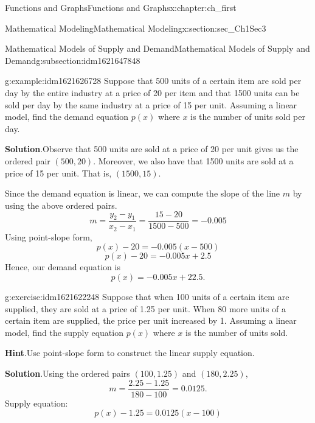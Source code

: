 \documentclass[oneside,10pt,]{book}
\newcommand{\blocktitlefont}{\relax}
\numberwithin{equation}{section}
\begin{document}
\begin{chapterptx}{Functions and Graphs}{}{Functions and Graphs}{}{}{x:chapter:ch_first}
\begin{sectionptx}{Mathematical Modeling}{}{Mathematical Modeling}{}{}{x:section:sec_Ch1Sec3}
\begin{subsectionptx}{Mathematical Models of Supply and Demand}{}{Mathematical Models of Supply and Demand}{}{}{g:subsection:idm1621647848}
\begin{example}{}{g:example:idm1621626728}
Suppose that 500 units of a certain item are sold per day by the entire industry at a price of \textdollar{}20 per item and that 1500 units can be sold per day by the same industry at a price of \textdollar{}15 per unit. Assuming a linear model, find the demand equation \(p(x)\) where \(x\) is the number of units sold per day.%
\par\smallskip%
\noindent\textbf{\blocktitlefont Solution}.\hypertarget{g:solution:idm1621628392}{}\quad{}Observe that 500 units are sold at a price of \textdollar{}20 per unit gives us the ordered pair \((500,20)\). Moreover, we also have that 1500 units are sold at a price of \textdollar{}15 per unit. That is, \((1500,15)\).%
\par
Since the demand equation is linear, we can compute the slope of the line \(m\) by using the above ordered pairs.%
%
\begin{equation*}
m=\frac{y_2-y_1}{x_2-x_1}=\frac{15-20}{1500-500}=-0.005
\end{equation*}
Using point-slope form,%
\begin{equation*}
p(x)-20=-0.005(x-500)
\end{equation*}
%
\begin{equation*}
p(x)-20=-0.005x+2.5
\end{equation*}
Hence, our demand equation is%
\begin{equation*}
p(x)=-0.005x+22.5\text{.}
\end{equation*}
\end{example}
\begin{inlineexercise}{}{g:exercise:idm1621622248}%
Suppose that when 100 units of a certain item are supplied, they are sold at a price of \textdollar{}1.25 per unit. When 80 more units of a certain item are supplied, the price per unit increased by \textdollar{}1. Assuming a linear model, find the supply equation \(p(x)\) where \(x\) is the number of units sold.\par\smallskip%
\noindent\textbf{\blocktitlefont Hint}.\hypertarget{g:hint:idm1621622504}{}\quad{}Use point-slope form to construct the linear supply equation.\par\smallskip%
\noindent\textbf{\blocktitlefont Solution}.\hypertarget{g:solution:idm1621618664}{}\quad{}Using the ordered pairs \((100,1.25)\) and \((180,2.25)\),%
%
\begin{equation*}
m=\frac{2.25-1.25}{180-100}=0.0125.
\end{equation*}
Supply equation:%
\begin{equation*}
p(x)-1.25=0.0125(x-100)

\end{equation*}
\end{inlineexercise}
\end{subsectionptx}
\end{sectionptx}
\end{chapterptx}
\end{document}
